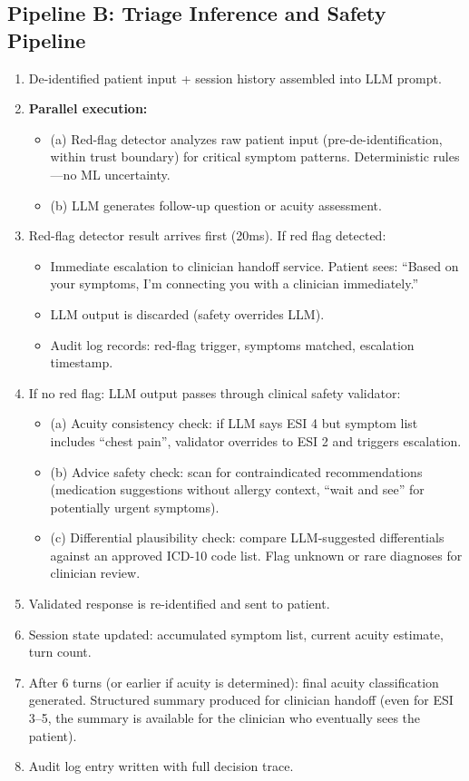 \subsection*{Pipeline B: Triage Inference and Safety Pipeline}
\begin{enumerate}
  \item De-identified patient input + session history assembled into LLM prompt.
  \item \textbf{Parallel execution:}
  \begin{itemize}
    \item (a) Red-flag detector analyzes raw patient input (pre-de-identification, within trust boundary) for critical symptom patterns. Deterministic rules---no ML uncertainty.
    \item (b) LLM generates follow-up question or acuity assessment.
  \end{itemize}
  \item Red-flag detector result arrives first (20ms). If red flag detected:
  \begin{itemize}
    \item Immediate escalation to clinician handoff service. Patient sees: ``Based on your symptoms, I'm connecting you with a clinician immediately.''
    \item LLM output is discarded (safety overrides LLM).
    \item Audit log records: red-flag trigger, symptoms matched, escalation timestamp.
  \end{itemize}
  \item If no red flag: LLM output passes through clinical safety validator:
  \begin{itemize}
    \item (a) Acuity consistency check: if LLM says ESI 4 but symptom list includes ``chest pain'', validator overrides to ESI 2 and triggers escalation.
    \item (b) Advice safety check: scan for contraindicated recommendations (medication suggestions without allergy context, ``wait and see'' for potentially urgent symptoms).
    \item (c) Differential plausibility check: compare LLM-suggested differentials against an approved ICD-10 code list. Flag unknown or rare diagnoses for clinician review.
  \end{itemize}
  \item Validated response is re-identified and sent to patient.
  \item Session state updated: accumulated symptom list, current acuity estimate, turn count.
  \item After 6 turns (or earlier if acuity is determined): final acuity classification generated. Structured summary produced for clinician handoff (even for ESI 3--5, the summary is available for the clinician who eventually sees the patient).
  \item Audit log entry written with full decision trace.
\end{enumerate}

